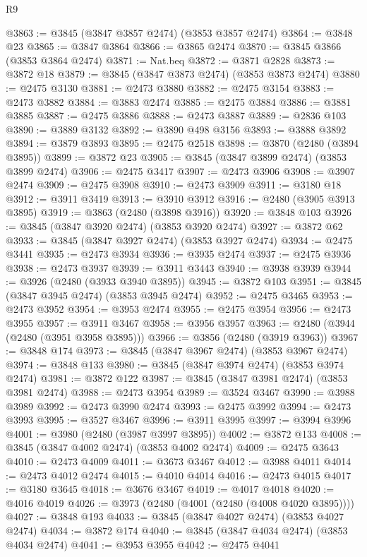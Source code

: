 \begin{lexlean}{R9}
\begin{coremodule}
@3863 := @3845 (@3847 @3857 @2474) (@3853 @3857 @2474)
@3864 := @3848 @23
@3865 := @3847 @3864
@3866 := @3865 @2474
@3870 := @3845 @3866 (@3853 @3864 @2474)
@3871 := Nat.beq
@3872 := @3871 @2828
@3873 := @3872 @18
@3879 := @3845 (@3847 @3873 @2474) (@3853 @3873 @2474)
@3880 := @2475 @3130
@3881 := @2473 @3880
@3882 := @2475 @3154
@3883 := @2473 @3882
@3884 := @3883 @2474
@3885 := @2475 @3884
@3886 := @3881 @3885
@3887 := @2475 @3886
@3888 := @2473 @3887
@3889 := @2836 @103
@3890 := @3889 @3132
@3892 := @3890 @498 @3156
@3893 := @3888 @3892
@3894 := @3879 @3893
@3895 := @2475 @2518
@3898 := @3870 (@2480 (@3894 @3895))
@3899 := @3872 @23
@3905 := @3845 (@3847 @3899 @2474) (@3853 @3899 @2474)
@3906 := @2475 @3417
@3907 := @2473 @3906
@3908 := @3907 @2474
@3909 := @2475 @3908
@3910 := @2473 @3909
@3911 := @3180 @18
@3912 := @3911 @3419
@3913 := @3910 @3912
@3916 := @2480 (@3905 @3913 @3895)
@3919 := @3863 (@2480 (@3898 @3916))
@3920 := @3848 @103
@3926 := @3845 (@3847 @3920 @2474) (@3853 @3920 @2474)
@3927 := @3872 @62
@3933 := @3845 (@3847 @3927 @2474) (@3853 @3927 @2474)
@3934 := @2475 @3441
@3935 := @2473 @3934
@3936 := @3935 @2474
@3937 := @2475 @3936
@3938 := @2473 @3937
@3939 := @3911 @3443
@3940 := @3938 @3939
@3944 := @3926 (@2480 (@3933 @3940 @3895))
@3945 := @3872 @103
@3951 := @3845 (@3847 @3945 @2474) (@3853 @3945 @2474)
@3952 := @2475 @3465
@3953 := @2473 @3952
@3954 := @3953 @2474
@3955 := @2475 @3954
@3956 := @2473 @3955
@3957 := @3911 @3467
@3958 := @3956 @3957
@3963 := @2480 (@3944 (@2480 (@3951 @3958 @3895)))
@3966 := @3856 (@2480 (@3919 @3963))
@3967 := @3848 @174
@3973 := @3845 (@3847 @3967 @2474) (@3853 @3967 @2474)
@3974 := @3848 @133
@3980 := @3845 (@3847 @3974 @2474) (@3853 @3974 @2474)
@3981 := @3872 @122
@3987 := @3845 (@3847 @3981 @2474) (@3853 @3981 @2474)
@3988 := @2473 @3954
@3989 := @3524 @3467
@3990 := @3988 @3989
@3992 := @2473 @3990 @2474
@3993 := @2475 @3992
@3994 := @2473 @3993
@3995 := @3527 @3467
@3996 := @3911 @3995
@3997 := @3994 @3996
@4001 := @3980 (@2480 (@3987 @3997 @3895))
@4002 := @3872 @133
@4008 := @3845 (@3847 @4002 @2474) (@3853 @4002 @2474)
@4009 := @2475 @3643
@4010 := @2473 @4009
@4011 := @3673 @3467
@4012 := @3988 @4011
@4014 := @2473 @4012 @2474
@4015 := @4010 @4014
@4016 := @2473 @4015
@4017 := @3180 @3645
@4018 := @3676 @3467
@4019 := @4017 @4018
@4020 := @4016 @4019
@4026 := @3973 (@2480 (@4001 (@2480 (@4008 @4020 @3895))))
@4027 := @3848 @193
@4033 := @3845 (@3847 @4027 @2474) (@3853 @4027 @2474)
@4034 := @3872 @174
@4040 := @3845 (@3847 @4034 @2474) (@3853 @4034 @2474)
@4041 := @3953 @3955
@4042 := @2475 @4041

\end{coremodule}
\end{lexlean}
